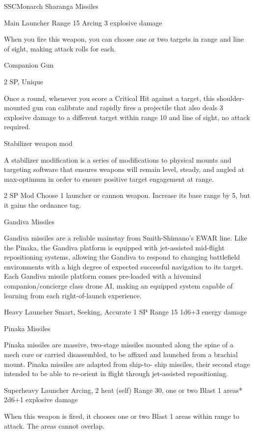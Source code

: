 \begin{mech}{SSC}{Monarch}
Sharanga Missiles

Main Launcher
Range 15
Arcing
3 explosive damage

When you fire this weapon, you can choose one or two targets in range and line of sight, making attack rolls for each.


Companion Gun

2 SP, Unique

Once a round, whenever you score a Critical Hit against a target, this shoulder-mounted gun can calibrate and rapidly fires a projectile that also deals 3 explosive damage to a different target within range 10 and line of sight, no attack required.


Stabilizer weapon mod

A stabilizer modification is a series of modifications to physical mounts and targeting software that ensures weapons will remain level, steady, and angled at max-optimum in order to ensure positive target engagement at range.

2 SP
Mod
Choose 1 launcher or cannon weapon. Increase its base range by 5, but it gains the ordnance tag.


Gandiva Missiles

Gandiva missiles are a reliable mainstay from Smith-Shimano's EWAR line. Like the Pinaka, the Gandiva platform is equipped with jet-assisted mid-flight repositioning systems, allowing the Gandiva to respond to changing battlefield environments with a high degree of expected successful navigation to its target. Each Gandiva missile platform comes pre-loaded with a hivemind companion/concierge class drone AI, making an equipped system capable of learning from each right-of-launch experience.

Heavy Launcher
Smart, Seeking, Accurate
1 SP
Range 15
1d6+3 energy damage


Pinaka Missiles

Pinaka missiles are massive, two-stage missiles mounted along the spine of a mech core or carried disassembled, to be affixed and launched from a brachial mount.  Pinaka missiles are adapted from ship-to- ship missiles, their second stage intended to be able to re-orient in flight through jet-assisted repositioning.

Superheavy Launcher
Arcing, 2 heat (self)
Range 30, one or two Blast 1 areas*
2d6+1 explosive damage

When this weapon is fired, it chooses one or two Blast 1 areas within range to attack. The areas cannot overlap.



\end{mech}
